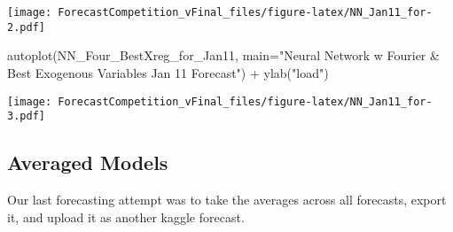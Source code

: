 \documentclass[
]{article}
\newenvironment{Shaded}{\begin{snugshade}}{\end{snugshade}}
\newcommand{\AttributeTok}[1]{\textcolor[rgb]{0.77,0.63,0.00}{#1}}
\newcommand{\ConstantTok}[1]{\textcolor[rgb]{0.00,0.00,0.00}{#1}}
\newcommand{\DocumentationTok}[1]{\textcolor[rgb]{0.56,0.35,0.01}{\textbf{\textit{#1}}}}
\newcommand{\FunctionTok}[1]{\textcolor[rgb]{0.00,0.00,0.00}{#1}}
\newcommand{\NormalTok}[1]{#1}
\newcommand{\SpecialCharTok}[1]{\textcolor[rgb]{0.00,0.00,0.00}{#1}}
\newcommand{\StringTok}[1]{\textcolor[rgb]{0.31,0.60,0.02}{#1}}
\begin{document}
\texttt{[image: ForecastCompetition\_vFinal\_files/figure-latex/NN\_Jan11\_for-2.pdf]}

\begin{Shaded}
\begin{Highlighting}[]
\FunctionTok{autoplot}\NormalTok{(NN\_Four\_BestXreg\_for\_Jan11, }\AttributeTok{main=}\StringTok{"Neural Network w Fourier \& Best Exogenous Variables Jan \textquotesingle{}11 Forecast"}\NormalTok{) }\SpecialCharTok{+} \FunctionTok{ylab}\NormalTok{(}\StringTok{"load"}\NormalTok{) }
\end{Highlighting}
\end{Shaded}

\texttt{[image: ForecastCompetition\_vFinal\_files/figure-latex/NN\_Jan11\_for-3.pdf]}

\begin{Shaded}
\end{Shaded}

\hypertarget{averaged-models}{%
\subsection{Averaged Models}\label{averaged-models}}

Our last forecasting attempt was to take the averages across all
forecasts, export it, and upload it as another kaggle forecast.
\end{document}
